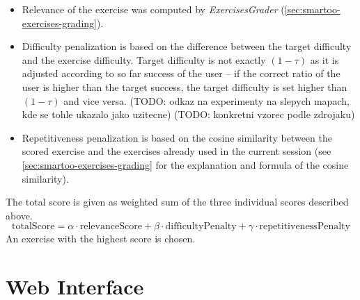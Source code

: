\documentclass[a4paper, 12pt, twoside]{fithesis2}		%
\renewcommand{\_}{\leavevmode \kern0.0em\vbox{\hrule width0.4em}}
\newcommand{\squarebullet}{\textcolor{black}{\raisebox{0.15em}{\rule{4pt}{4pt}}}}
\newenvironment{myItemize}{
  \begin{itemize}[leftmargin=2em,rightmargin=1em,itemsep=\parskip ,parsep=0em,topsep=0em,partopsep=0em]
  \renewcommand{\labelitemi}{\squarebullet}
  \renewcommand{\labelitemii}{$\diamond$}
}{
  \end{itemize}
}
\begin{document}
\begin{myItemize}
  \item Relevance of the exercise was computed by \textit{ExercisesGrader}
(\autoref{sec:smartoo-exercises-grading}).

  \item Difficulty penalization is based on the difference between the target difficulty and the exercise difficulty.
Target difficulty is not exactly $(1 - \tau)$ as it is adjusted according to
so far success of the user -- if the correct ratio of the user is higher than the target success,
the target difficulty is set higher than $(1 - \tau)$ and vice versa.
(TODO: odkaz na experimenty na slepych mapach, kde se tohle ukazalo jako uzitecne)
(TODO: konkretni vzorec podle zdrojaku)

  \item Repetitiveness penalization is based on the cosine similarity between the scored exercise and the exercises already used in the current session
(see \autoref{sec:smartoo-exercises-grading} for the explanation and formula of the cosine similarity).
\end{myItemize}
The total score is given as weighted sum of the three individual scores described above.
$$
\text{totalScore} = \alpha \cdot \text{relevanceScore} + \beta \cdot \text{difficultyPenalty} + \gamma \cdot \text{repetitivenessPenalty}
$$
An exercise with the highest score is chosen.


\section{Web Interface}
\label{sec:smartoo-web}
\end{document}
